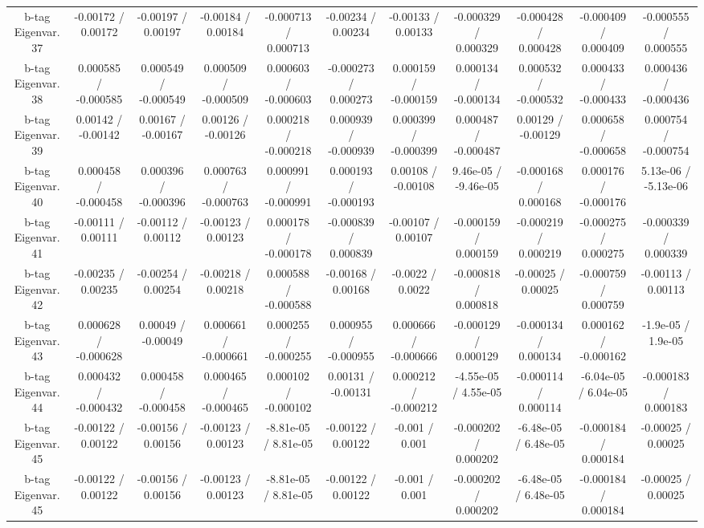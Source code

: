 \begin{table}[htbp]
\begin{center}
\begin{tabular}{|c|c|c|c|c|c|c|c|c|c|c|}
  b-tag Eigenvar. 37 & -0.00172 / 0.00172 & -0.00197 / 0.00197 & -0.00184 / 0.00184 & -0.000713 / 0.000713 & -0.00234 / 0.00234 & -0.00133 / 0.00133 & -0.000329 / 0.000329 & -0.000428 / 0.000428 & -0.000409 / 0.000409 & -0.000555 / 0.000555 \\ 
  b-tag Eigenvar. 38 & 0.000585 / -0.000585 & 0.000549 / -0.000549 & 0.000509 / -0.000509 & 0.000603 / -0.000603 & -0.000273 / 0.000273 & 0.000159 / -0.000159 & 0.000134 / -0.000134 & 0.000532 / -0.000532 & 0.000433 / -0.000433 & 0.000436 / -0.000436 \\ 
  b-tag Eigenvar. 39 & 0.00142 / -0.00142 & 0.00167 / -0.00167 & 0.00126 / -0.00126 & 0.000218 / -0.000218 & 0.000939 / -0.000939 & 0.000399 / -0.000399 & 0.000487 / -0.000487 & 0.00129 / -0.00129 & 0.000658 / -0.000658 & 0.000754 / -0.000754 \\ 
  b-tag Eigenvar. 40 & 0.000458 / -0.000458 & 0.000396 / -0.000396 & 0.000763 / -0.000763 & 0.000991 / -0.000991 & 0.000193 / -0.000193 & 0.00108 / -0.00108 & 9.46e-05 / -9.46e-05 & -0.000168 / 0.000168 & 0.000176 / -0.000176 & 5.13e-06 / -5.13e-06 \\ 
  b-tag Eigenvar. 41 & -0.00111 / 0.00111 & -0.00112 / 0.00112 & -0.00123 / 0.00123 & 0.000178 / -0.000178 & -0.000839 / 0.000839 & -0.00107 / 0.00107 & -0.000159 / 0.000159 & -0.000219 / 0.000219 & -0.000275 / 0.000275 & -0.000339 / 0.000339 \\ 
  b-tag Eigenvar. 42 & -0.00235 / 0.00235 & -0.00254 / 0.00254 & -0.00218 / 0.00218 & 0.000588 / -0.000588 & -0.00168 / 0.00168 & -0.0022 / 0.0022 & -0.000818 / 0.000818 & -0.00025 / 0.00025 & -0.000759 / 0.000759 & -0.00113 / 0.00113 \\ 
  b-tag Eigenvar. 43 & 0.000628 / -0.000628 & 0.00049 / -0.00049 & 0.000661 / -0.000661 & 0.000255 / -0.000255 & 0.000955 / -0.000955 & 0.000666 / -0.000666 & -0.000129 / 0.000129 & -0.000134 / 0.000134 & 0.000162 / -0.000162 & -1.9e-05 / 1.9e-05 \\ 
  b-tag Eigenvar. 44 & 0.000432 / -0.000432 & 0.000458 / -0.000458 & 0.000465 / -0.000465 & 0.000102 / -0.000102 & 0.00131 / -0.00131 & 0.000212 / -0.000212 & -4.55e-05 / 4.55e-05 & -0.000114 / 0.000114 & -6.04e-05 / 6.04e-05 & -0.000183 / 0.000183 \\ 
  b-tag Eigenvar. 45 & -0.00122 / 0.00122 & -0.00156 / 0.00156 & -0.00123 / 0.00123 & -8.81e-05 / 8.81e-05 & -0.00122 / 0.00122 & -0.001 / 0.001 & -0.000202 / 0.000202 & -6.48e-05 / 6.48e-05 & -0.000184 / 0.000184 & -0.00025 / 0.00025 \\ 
  b-tag Eigenvar. 45 & -0.00122 / 0.00122 & -0.00156 / 0.00156 & -0.00123 / 0.00123 & -8.81e-05 / 8.81e-05 & -0.00122 / 0.00122 & -0.001 / 0.001 & -0.000202 / 0.000202 & -6.48e-05 / 6.48e-05 & -0.000184 / 0.000184 & -0.00025 / 0.00025 \\ 

\end{tabular}
\end{center}
\end{table}
